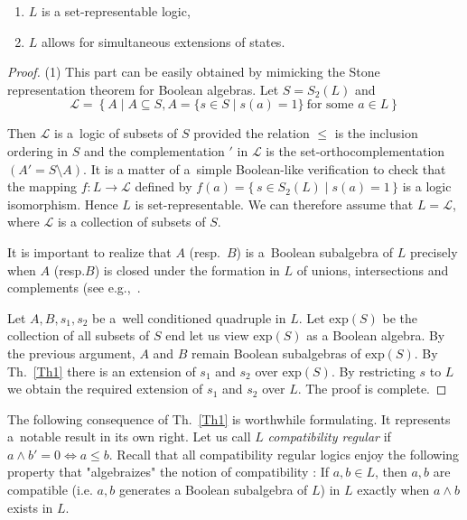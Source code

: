 \documentclass{article}
\def\exp{\mathrm{exp}}
\begin{document}
{\begin{theorem}
\begin{enumerate}
\item $L$ is a set-representable logic,

\item $L$ allows for simultaneous extensions of states.
\end{enumerate}

\end{theorem}

\begin{proof}
(1) This part can be easily obtained by mimicking the Stone representation theorem for Boolean algebras. Let $S=S_2(L)$
and
$$
\mathcal L=
\left\{A \mid A \subseteq S, A= \{s\in S\mid s(a)=1 \}~\text{for some }
a\in L
\right\}
$$

Then $\mathcal L$ is a~logic of subsets of $S$ provided the relation $\leq$ is the inclusion ordering in $S$ and the complementation $'$ in $\mathcal L$ is the set-orthocomplementation $(A'=S \setminus A)$.
It is a matter of a~simple Boolean-like verification to check that the mapping $f:L\to\mathcal L$ 
defined by
$
f(a)=\{\,s\in S_2(L)\mid s(a)=1\,\}
$
is a logic isomorphism. Hence $L$ is set-representable. We can therefore assume that $L=\mathcal L$, where $\mathcal L$ is a
collection of subsets of $S$.

It is important to realize that $A$ (resp.\ $B$) is a~Boolean subalgebra of $L$ precisely
when $A$ (resp.$B$) is closed under the formation in $L$ of unions, intersections and
complements (see e.g.,~\cite{PtakConcrete}.

Let $A,B,s_1,s_2$ be a~well conditioned quadruple in $L$. Let $\exp(S)$ be the collection of all subsets of $S$ end let us view $\exp(S)$ as a Boolean algebra. By the previous argument, $A$ and $B$ remain Boolean subalgebras of
$\exp(S)$. By Th.~\ref{Th1} there is an extension of $s_1$ and $s_2$ over $\exp(S)$. By restricting $s$ to $L$ we obtain the required extension of $s_1$ and $s_2$ over $L$. The proof is complete.
\end{proof}


The following consequence of Th.~\ref{Th1} is worthwhile formulating. It represents a~notable result in its own right. Let us call $L$ \textit{compatibility regular} if
$a\wedge b'=0 \iff a\leq b$. Recall that all compatibility regular logics enjoy the following
property that "algebraizes" the notion of compatibility : If $a,b\in L$, then $a,b$ are compatible (i.e. $a,b$ generates a Boolean subalgebra of $L$) in $L$ exactly when $a \land b$ exists in $L$.

}
\end{document}
